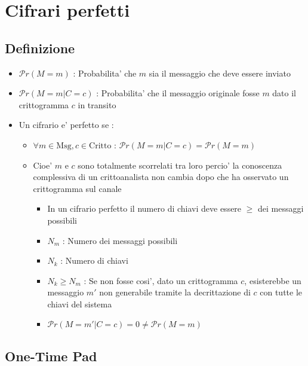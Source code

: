 \chapter{Cifrari perfetti}
\section{Definizione}

\begin{itemize}
    \item $\mathcal{P}r(M = m)$ : Probabilita' che $m$ sia il messaggio che deve essere inviato
    \item $\mathcal{P}r(M = m | C = c)$ : Probabilita' che il messaggio originale fosse $m$ dato il crittogramma $c$ in transito
    \item Un cifrario e' perfetto se :
    \begin{itemize}
        \item $\forall m \in \text{Msg}, c \in \text{Critto}$ : $\mathcal{P}r(M = m | C = c) = \mathcal{P}r(M = m)$
        \item Cioe' $m$ e $c$ sono totalmente scorrelati tra loro percio' la conoscen\-za complessiva di un crittoanalista non cambia dopo che ha osservato un crittogramma sul canale
        \begin{itemize}
            \item In un cifrario perfetto il numero di chiavi deve essere $\geq$ dei messaggi possibili
            \item $N_m$ : Numero dei messaggi possibili
            \item $N_k$ : Numero di chiavi
            \item $N_k \geq N_m$ : Se non fosse cosi', dato un crittogramma $c$, esisterebbe un messaggio $m'$ non generabile tramite la decrittazione di $c$ con tutte le chiavi del sistema
            \item $\mathcal{P}r(M = m' | C = c) = 0 \not= \mathcal{P}r(M = m)$
        \end{itemize}
    \end{itemize}
\end{itemize}
\section{One-Time Pad}

